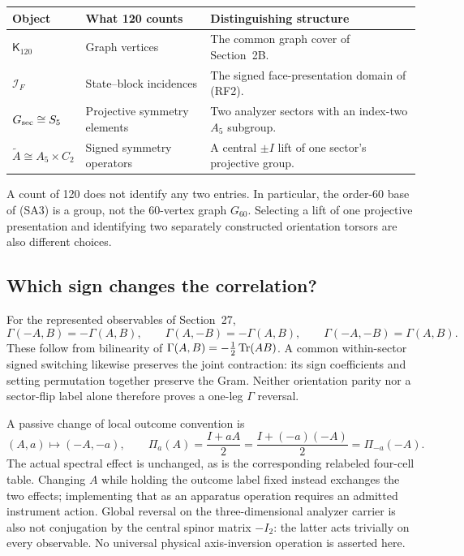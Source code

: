 \begin{center}\small
\begin{tabularx}{\textwidth}{@{}p{}p{}X@{}}
\toprule
Object & What 120 counts & Distinguishing structure \\
\midrule
$\mathsf K_{120}$ & Graph vertices & The common graph cover of Section~2B. \\
$\mathcal I_F$ & State--block incidences & The signed face-presentation domain of (RF2). \\
$G_{\rm sec}\cong S_5$ & Projective symmetry elements & Two analyzer sectors with an index-two $A_5$ subgroup. \\
$\widetilde A\cong A_5\times C_2$ & Signed symmetry operators & A central $\pm I$ lift of one sector's projective group. \\
\bottomrule
\end{tabularx}\end{center}
A count of 120 does not identify any two entries. In particular, the order-60 base of (SA3) is a group, not the 60-vertex graph $G_{60}$. Selecting a lift of one projective presentation and identifying two separately constructed orientation torsors are also different choices.

\subsection*{Which sign changes the correlation?}
For the represented observables of Section~27,
\begin{equation}
\Gamma(-A,B)=-\Gamma(A,B),\qquad
\Gamma(A,-B)=-\Gamma(A,B),\qquad
\Gamma(-A,-B)=\Gamma(A,B).
\tag{SA5}\label{eq:correlationreversal}
\end{equation}
These follow from bilinearity of $\Gamma(A,B)=-\tfrac12\operatorname{Tr}(AB)$. A common within-sector signed switching likewise preserves the joint contraction: its sign coefficients and setting permutation together preserve the Gram. Neither orientation parity nor a sector-flip label alone therefore proves a one-leg $\Gamma$ reversal.

A passive change of local outcome convention is
\begin{equation}
(A,a)\longmapsto(-A,-a),\qquad
\Pi_a(A)=\frac{I+aA}{2}
=\frac{I+(-a)(-A)}2=\Pi_{-a}(-A).
\tag{SA6}\label{eq:passiveoutcomereference}
\end{equation}
The actual spectral effect is unchanged, as is the corresponding relabeled four-cell table. Changing $A$ while holding the outcome label fixed instead exchanges the two effects; implementing that as an apparatus operation requires an admitted instrument action. Global reversal on the three-dimensional analyzer carrier is also not conjugation by the central spinor matrix $-I_2$: the latter acts trivially on every observable. No universal physical axis-inversion operation is asserted here.

